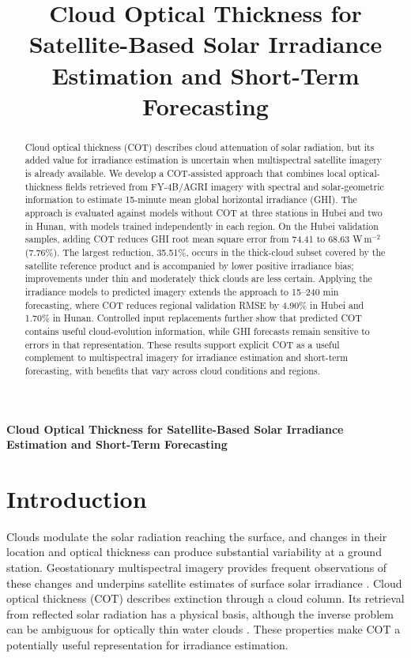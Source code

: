 \documentclass[11pt]{article}
\title{Cloud Optical Thickness for Satellite-Based Solar Irradiance Estimation and Short-Term Forecasting}
\author{}\date{}
\begin{document}
\begin{center}\LARGE\bfseries
Cloud Optical Thickness for Satellite-Based Solar Irradiance Estimation and Short-Term Forecasting
\end{center}
\begin{abstract}
Cloud optical thickness (COT) describes cloud attenuation of solar radiation, but its added value for irradiance estimation is uncertain when multispectral satellite imagery is already available. We develop a COT-assisted approach that combines local optical-thickness fields retrieved from FY-4B/AGRI imagery with spectral and solar-geometric information to estimate 15-minute mean global horizontal irradiance (GHI). The approach is evaluated against models without COT at three stations in Hubei and two in Hunan, with models trained independently in each region. On the Hubei validation samples, adding COT reduces GHI root mean square error from 74.41 to 68.63 W\,m$^{-2}$ (7.76\%). The largest reduction, 35.51\%, occurs in the thick-cloud subset covered by the satellite reference product and is accompanied by lower positive irradiance bias; improvements under thin and moderately thick clouds are less certain. Applying the irradiance models to predicted imagery extends the approach to 15--240 min forecasting, where COT reduces regional validation RMSE by 4.90\% in Hubei and 1.70\% in Hunan. Controlled input replacements further show that predicted COT contains useful cloud-evolution information, while GHI forecasts remain sensitive to errors in that representation. These results support explicit COT as a useful complement to multispectral imagery for irradiance estimation and short-term forecasting, with benefits that vary across cloud conditions and regions.
\end{abstract}

\section{Introduction}
Clouds modulate the solar radiation reaching the surface, and changes in their location and optical thickness can produce substantial variability at a ground station. Geostationary multispectral imagery provides frequent observations of these changes and underpins satellite estimates of surface solar irradiance \cite{huang2019}. Cloud optical thickness (COT) describes extinction through a cloud column. Its retrieval from reflected solar radiation has a physical basis, although the inverse problem can be ambiguous for optically thin water clouds \cite{nakajima1990}. These properties make COT a potentially useful representation for irradiance estimation.
\end{document}
